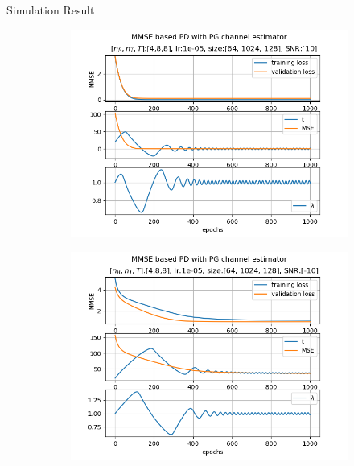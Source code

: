 \documentclass[hyperref={bookmarks=false}]{beamer}
\numberwithin{figure}{section}
\begin{document}
\begin{frame}[allowframebreaks]{Simulation Result}

\begin{figure}[H]
    \centering
    \begin{subfigure}[b]{.8\linewidth}
        \includegraphics[width=\linewidth]{figures/lr1e-05_[64, 1024, 128]_ep1000_SNR_[10].png}
    \end{subfigure}
    \begin{subfigure}[b]{.8\linewidth}
        \includegraphics[width=\linewidth]{figures/lr1e-05_[64, 1024, 128]_ep1000_SNR_[-10].png}

\end{subfigure}
\end{figure}
\end{frame}
\end{document}
